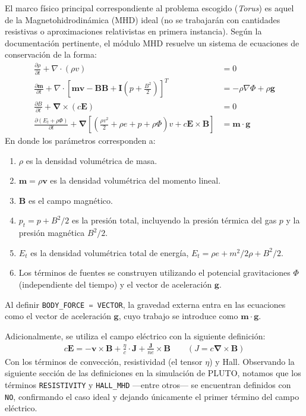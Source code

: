 \documentclass[11pt, letterpaper]{article}
\begin{document}
El marco físico principal correspondiente al problema escogido (\textit{Torus}) es aquel de la Magnetohidrodinámica (MHD) ideal (no se trabajarán con cantidades resistivas o aproximaciones relativistas en primera instancia). Según la documentación pertinente\cite{plutomanual}, el módulo MHD resuelve un sistema de ecuaciones de conservación de la forma:
\begin{subequations}\label{eq:MHD}
    \begin{align}
        \frac{\partial \rho}{\partial t} + \nabla \cdot (\rho v) &= 0 \\[5pt]
        \frac{\partial \mathbf{m}}{\partial t} + \nabla \cdot \left[ \mathbf{m}\mathbf{v} - \mathbf{BB} + \mathbf{I} \left(p + \frac{B^2}{2}\right) \right]^T &= -\rho \nabla \Phi + \rho \mathbf{g} \\[5pt]
        \frac{\partial B}{\partial t} + \mathbf{\nabla} \times (c\mathbf{E}) &= 0 \\[5pt]
        \frac{\partial (E_t + \rho \Phi)}{\partial t} + \mathbf{\nabla} \left[\left(   \frac{\rho v^2}{2} + \rho e + p + \rho \Phi\right)v + c\mathbf{E} \times \mathbf{B}\right] &= \mathbf{m} \cdot \mathbf{g} 
    \end{align}    
\end{subequations}
En donde los parámetros corresponden a:
\begin{enumerate}
    \item $\rho$ es la densidad volumétrica de masa.
    \item $\mathbf{m} = \rho \mathbf{v}$ es la densidad volumétrica del momento lineal.
    \item $\mathbf{B}$ es el campo magnético.
    \item $p_t = p + B^2/2$ es la presión total, incluyendo la presión térmica del gas $p$ y la presión magnética $B^2/2$.
    \item $E_t$ es la densidad volumétrica total de energía, $E_t = \rho e + m^2/2\rho + B^2/2$.
    \item Los términos de fuentes se construyen utilizando el potencial gravitaciones $\Phi$ (independiente del tiempo) y el vector de aceleración $\mathbf{g}$.
\end{enumerate}
Al definir \lstinline[language=C]{BODY_FORCE = VECTOR}, la gravedad externa entra en las ecuaciones como el vector de aceleración $\mathbf{g}$, cuyo trabajo se introduce como $\mathbf{m \cdot g}$.

\medskip

Adicionalmente, se utiliza el campo eléctrico con la siguiente definición:
\begin{align*}
    c\mathbf{E} = -\mathbf{v} \times \mathbf{B} + \frac{\eta}{c} \cdot \mathbf{J} + \frac{\mathbf{J}}{ne} \times \mathbf{B} \quad \quad (J = c\mathbf{\nabla \times B})
\end{align*}
Con los términos de convección, resistividad (el tensor $\eta$) y Hall. Observando la siguiente sección de las definiciones en la simulación de PLUTO, notamos que los términos \lstinline[language=C]{RESISTIVITY} y \lstinline[language=C]{HALL_MHD} ---entre otros--- se encuentran definidos con \lstinline[language=C]{NO}, confirmando el caso ideal y dejando únicamente el primer término del campo eléctrico.
\end{document}
